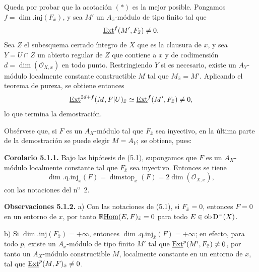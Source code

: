 Queda por probar que la acotación $(*)$ es la mejor posible. Pongamos $f=\dim.\mathrm{inj}(F_{\bar{x}})$, y sea $M'$ un $A_{\bar{x}}$-módulo de tipo finito tal que
\[
        \underline{\operatorname{Ext}}^f(M',F_{\bar{x}})\neq0.
\]
Sea $Z$ el subesquema cerrado íntegro de $X$ que es la clausura de $x$, y sea $Y=U\cap Z$ un abierto regular de $Z$ que contiene a $x$ y de codimensión $d=\dim(\mathcal{O}_{X,x})$ en todo punto. Restringiendo $Y$ si es necesario, existe un $A_Y$-módulo localmente constante constructible $M$ tal que $M_{\bar{x}}=M'$. Aplicando el teorema de pureza, se obtiene entonces
\[
        \underline{\operatorname{Ext}}^{2d+f}(M,F|U)_{\bar{x}}\simeq \underline{\operatorname{Ext}}^f(M',F_{\bar{x}})\neq0,
\]
lo que termina la demostración.

Obsérvese que, si $F$ es un $A_X$-módulo tal que $F_{\bar{x}}$ sea inyectivo, en la última parte de la demostración se puede elegir $M=A_Y$; se obtiene, pues:

\textbf{Corolario 5.1.1.} Bajo las hipótesis de (5.1), supongamos que $F$ es un $A_X$-módulo localmente constante tal que $F_{\bar{x}}$ sea inyectivo. Entonces se tiene
\[
        \dim.\mathrm{q.inj}_{\bar{x}}(F)=\operatorname{dimstop}_{\bar{x}}(F)=2\dim(\mathcal{O}_{X,x}),
\]
con las notaciones del n\textsuperscript{o}~2.

\textbf{Observaciones 5.1.2.} a) Con las notaciones de (5.1), si $F_{\bar{x}}=0$, entonces $F=0$ en un entorno de $x$, por tanto $\mathbb{R}\underline{\operatorname{Hom}}(E,F)_{\bar{x}}=0$ para todo $E\in\operatorname{ob}\mathrm{D}^{-}(X)$.

b) Si $\dim.\mathrm{inj}(F_{\bar{x}})=+\infty$, entonces $\dim.\mathrm{q.inj}_{\bar{x}}(F)=+\infty$; en efecto, para todo $p$, existe un $A_{\bar{x}}$-módulo de tipo finito $M'$ tal que $\underline{\operatorname{Ext}}^p(M',F_{\bar{x}})\neq0$, por tanto un $A_X$-módulo constructible $M$, localmente constante en un entorno de $x$, tal que $\underline{\operatorname{Ext}}^p(M,F)_{\bar{x}}\neq0$.
